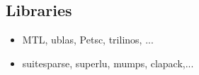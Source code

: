 \subsection{Libraries}
\label{sec:libraries}

\begin{frame}{}
  \begin{itemize}
  \item MTL, ublas, Petsc, trilinos, ...
  \item suitesparse, superlu, mumps, clapack,...
  \end{itemize}
\end{frame}







